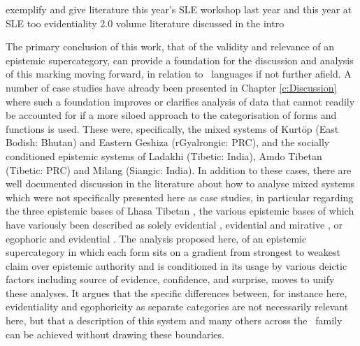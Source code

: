 exemplify and give literature
this year's SLE workshop
last year and this year at SLE too
evidentiality 2.0 volume
literature discussed in the intro

The primary conclusion of this work, that of the validity and relevance of an epistemic supercategory, can provide a foundation for the discussion and analysis of this marking moving forward, in relation to \lfam\ languages if not further afield. A number of case studies have already been presented in Chapter \ref{c:Discussion} where such a foundation improves or clarifies analysis of data that cannot readily be accounted for if a more siloed approach to the categorisation of forms and functions is used. These were, specifically, the mixed systems of Kurtöp (East Bodish: Bhutan) and Eastern Geshiza (rGyalrongic: PRC), and the socially conditioned epistemic systems of Ladakhi (Tibetic: India), Amdo Tibetan (Tibetic: PRC) and Milang (Siangic: India). In addition to these cases, there are well documented discussion in the literature about how to analyse mixed systems which were not specifically presented here as case studies, in particular regarding the three epistemic bases of Lhasa Tibetan \cite{DeLancey2017Tibetan}, the various epistemic bases of which have variously been described as solely evidential \cite{Gawne2017}, evidential and mirative \cites{DeLanceyMirativity1997}{DeLancey2012}, or egophoric and evidential \cites{Tournadre1992}{Widmer2017}. The analysis proposed here, of an epistemic supercategory in which each form sits on a gradient from strongest to weakest claim over epistemic authority and is conditioned in its usage by various deictic factors including source of evidence, confidence, and surprise, moves to unify these analyses. It argues that the specific differences between, for instance here, evidentiality and egophoricity as separate categories are not necessarily relevant here, but that a description of this system and many others across the \lfam\ family can be achieved without drawing these boundaries.

